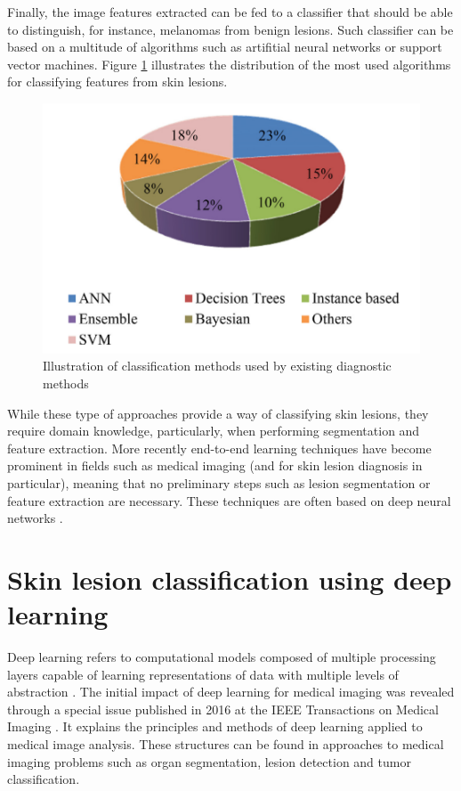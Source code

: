     
    Finally, the image features extracted can be fed to a classifier that should be able to distinguish, for instance, melanomas from benign lesions. Such classifier can be based on a multitude of algorithms such as artifitial neural networks or support vector machines. Figure \ref{fig:classificationalgorithms} illustrates the distribution of the most used algorithms for classifying features from skin lesions. \par
    
    \begin{figure}[ht]
      \centering
        \includegraphics[width=0.5\linewidth]{figs/classificationalgorithms.png}
      \caption{Illustration of classification methods used by existing diagnostic methods \cite{Pathan2018}}
      \label{fig:classificationalgorithms}
    \end{figure}
    
    While these type of approaches provide a way of classifying skin lesions, they require domain knowledge, particularly, when performing segmentation and feature extraction. More recently end-to-end learning techniques have become prominent in fields such as medical imaging (and for skin lesion diagnosis in particular), meaning that no preliminary steps such as lesion segmentation or feature extraction are necessary. These techniques are often based on deep neural networks \cite{?}.


\section{Skin lesion classification using deep learning}
    Deep learning refers to computational models composed of multiple processing layers capable of learning representations of data with multiple levels of abstraction \cite{Goodfellow-et-al-2016}. The initial impact of deep learning for medical imaging was revealed through a special issue published in 2016 at the IEEE Transactions on Medical Imaging \cite{Greenspan2016}. It explains the principles and methods of deep learning applied to medical image analysis. These structures can be found in approaches to medical imaging problems such as organ segmentation, lesion detection and tumor classification. \par
    
